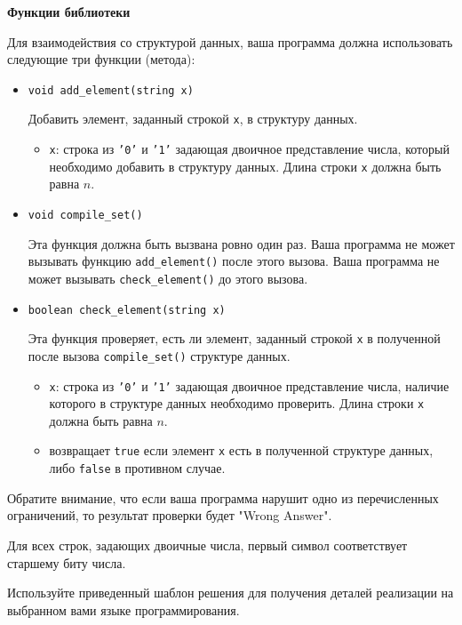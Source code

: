 \textbf{Функции библиотеки}

Для взаимодействия со структурой данных, ваша программа должна использовать следующие три функции (метода):

\begin{itemize}
\item \texttt{void add\_element(string x)}

Добавить элемент, заданный строкой \texttt{x}, в структуру данных.
\begin{itemize}
	\item \texttt{x}: строка из \texttt{'0'} и \texttt{'1'} задающая двоичное представление числа, который необходимо добавить в структуру данных. Длина строки \texttt{x} должна быть равна $n$.
\end{itemize}
\end{itemize}

\begin{itemize}
\item \texttt{void compile\_set()}

Эта функция должна быть вызвана ровно один раз. Ваша программа не может вызывать функцию \texttt{add\_element()} после этого вызова. Ваша программа не может вызывать \texttt{check\_element()} до этого вызова.
\end{itemize}

\begin{itemize}
\item \texttt{boolean check\_element(string x)}

Эта функция проверяет, есть ли элемент, заданный строкой \texttt{x} в полученной после вызова \texttt{compile\_set()} структуре данных.
\begin{itemize}
	\item \texttt{x}: строка из \texttt{'0'} и \texttt{'1'} задающая двоичное представление числа, наличие которого в структуре данных необходимо проверить. Длина строки \texttt{x} должна быть равна $n$.
	\item возвращает \texttt{true} если элемент \texttt{x} есть в полученной структуре данных, либо \texttt{false} в противном случае.
\end{itemize}
\end{itemize}

Обратите внимание, что если ваша программа нарушит одно из перечисленных ограничений, то результат проверки будет "Wrong Answer".

Для всех строк, задающих двоичные числа, первый символ соответствует старшему биту числа.

Используйте приведенный шаблон решения для получения деталей реализации на выбранном вами языке программирования.
